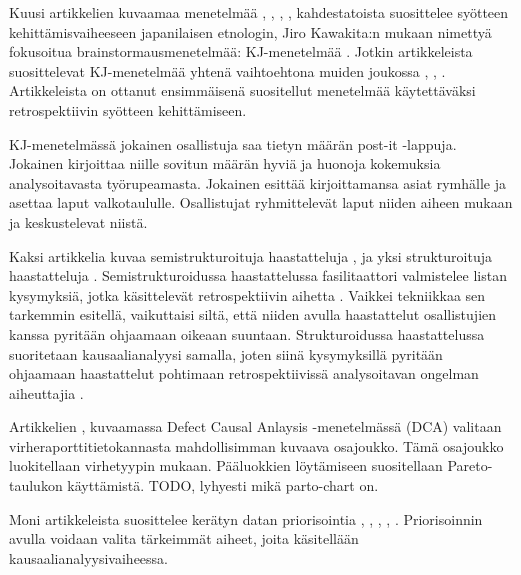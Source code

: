 Kuusi artikkelien kuvaamaa menetelmää \citep{birk2002postmortem}, \citep{dingsoyr2003extending}, \citep{staalhane2003post}, \citep{de2004learning}, \citep{Bjornson2009} kahdestatoista suosittelee syötteen kehittämisvaiheeseen japanilaisen etnologin, Jiro Kawakita:n mukaan nimettyä fokusoitua brainstormausmenetelmää: KJ-menetelmää \citep{dingsoyr2003extending}. Jotkin artikkeleista suosittelevat KJ-menetelmää yhtenä vaihtoehtona muiden joukossa \citep{birk2002postmortem}, \citep{staalhane2003post}, \citep{de2004learning}. Artikkeleista \citep{birk2002postmortem} on ottanut ensimmäisenä suositellut menetelmää käytettäväksi retrospektiivin syötteen kehittämiseen.

KJ-menetelmässä jokainen osallistuja saa tietyn määrän post-it -lappuja. Jokainen kirjoittaa niille sovitun määrän hyviä ja huonoja kokemuksia analysoitavasta työrupeamasta. Jokainen esittää kirjoittamansa asiat rymhälle ja asettaa laput valkotaululle. Osallistujat ryhmittelevät laput niiden aiheen mukaan ja keskustelevat niistä. \citep{birk2002postmortem}

Kaksi artikkelia kuvaa semistrukturoituja haastatteluja \citep{birk2002postmortem}, \citep{de2004learning} ja yksi strukturoituja haastatteluja \citep{staalhane2003post}. Semistrukturoidussa haastattelussa fasilitaattori valmistelee listan kysymyksiä, jotka käsittelevät retrospektiivin aihetta \citep{birk2002postmortem}. Vaikkei tekniikkaa sen tarkemmin esitellä, vaikuttaisi siltä, että niiden avulla haastattelut osallistujien kanssa pyritään ohjaamaan oikeaan suuntaan. Strukturoidussa haastattelussa suoritetaan kausaalianalyysi samalla, joten siinä kysymyksillä pyritään ohjaamaan haastattelut pohtimaan retrospektiivissä analysoitavan ongelman aiheuttajia \citep{staalhane2003post}.

Artikkelien \citep{kalinowski2012evidence}, \citep{card1998learning} kuvaamassa Defect Causal Anlaysis -menetelmässä (DCA) valitaan virheraporttitietokannasta mahdollisimman kuvaava osajoukko. Tämä osajoukko luokitellaan virhetyypin mukaan. Pääluokkien löytämiseen suositellaan Pareto-taulukon käyttämistä. TODO, lyhyesti mikä parto-chart on.

Moni artikkeleista suosittelee kerätyn datan priorisointia \citep{card1998learning}, \citep{birk2002postmortem}, \citep{staalhane2003post}, \citep{staalhane2004root}, \citep{karlsson2006case}. Priorisoinnin avulla voidaan valita tärkeimmät aiheet, joita käsitellään kausaalianalyysivaiheessa.


